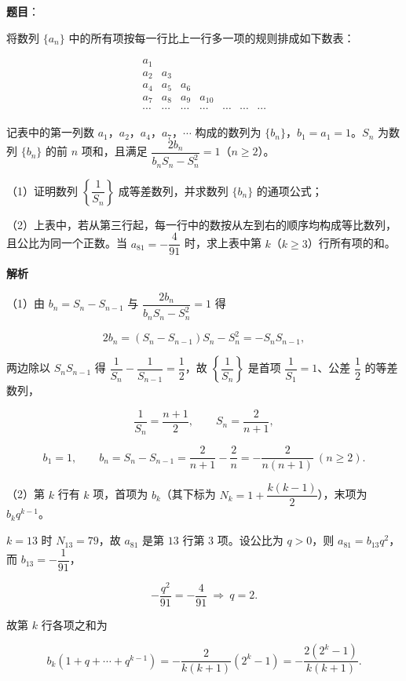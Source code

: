 \begin{answer}

\textbf{题目}：

将数列 $\{a_n\}$ 中的所有项按每一行比上一行多一项的规则排成如下数表：

\nopagebreak[4]
\[\begin{array}{ccccccc}
a_1&&&&&&\\
a_2&a_3&&&&&\\
a_4&a_5&a_6&&&&\\
a_7&a_8&a_9&a_{10}&&&\\
\cdots&\cdots&\cdots&\cdots&\cdots&\cdots&\cdots
\end{array}\]

记表中的第一列数 $a_1$，$a_2$，$a_4$，$a_7$，$\cdots$ 构成的数列为 $\{b_n\}$，$b_1=a_1=1$。$S_n$ 为数列 $\{b_n\}$ 的前 $n$ 项和，且满足 $\dfrac{2b_n}{b_nS_n-S_n^2}=1$（$n\geqslant2$）。

（1）证明数列 $\left\{\dfrac1{S_n}\right\}$ 成等差数列，并求数列 $\{b_n\}$ 的通项公式；

（2）上表中，若从第三行起，每一行中的数按从左到右的顺序均构成等比数列，且公比为同一个正数。当 $a_{81}=-\dfrac4{91}$ 时，求上表中第 $k$（$k\geqslant3$）行所有项的和。

\textbf{解析}

（1）由 $b_n=S_n-S_{n-1}$ 与 $\dfrac{2b_n}{b_nS_n-S_n^2}=1$ 得

\nopagebreak[4]
\[2b_n=(S_n-S_{n-1})S_n-S_n^2=-S_nS_{n-1},\]

两边除以 $S_nS_{n-1}$ 得 $\dfrac1{S_n}-\dfrac1{S_{n-1}}=\dfrac12$，故 $\left\{\dfrac1{S_n}\right\}$ 是首项 $\dfrac1{S_1}=1$、公差 $\dfrac12$ 的等差数列，

\nopagebreak[4]
\[\frac1{S_n}=\frac{n+1}2,\qquad S_n=\frac2{n+1},\]

\nopagebreak[4]
\[b_1=1,\qquad b_n=S_n-S_{n-1}=\frac2{n+1}-\frac2n=-\frac2{n(n+1)}\ (n\geqslant2).\]

（2）第 $k$ 行有 $k$ 项，首项为 $b_k$（其下标为 $N_k=1+\dfrac{k(k-1)}2$），末项为 $b_kq^{k-1}$。

$k=13$ 时 $N_{13}=79$，故 $a_{81}$ 是第 $13$ 行第 $3$ 项。设公比为 $q>0$，则 $a_{81}=b_{13}q^2$，而 $b_{13}=-\dfrac1{91}$，

\nopagebreak[4]
\[-\frac{q^2}{91}=-\frac4{91}\ \Longrightarrow\ q=2.\]

故第 $k$ 行各项之和为

\nopagebreak[4]
\[b_k\left(1+q+\cdots+q^{k-1}\right)=-\frac{2}{k(k+1)}\left(2^k-1\right)=-\frac{2(2^k-1)}{k(k+1)}.\]


\end{answer}
